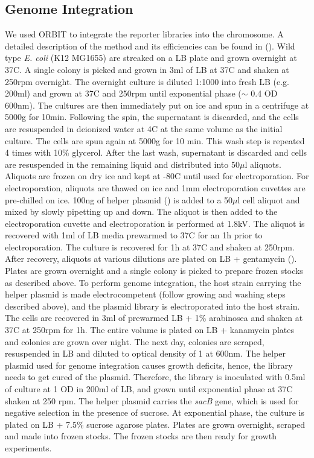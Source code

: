 \subsection{Genome Integration}
We used ORBIT to integrate the reporter libraries into the chromosome. A detailed description of the method and its efficiencies can be found in (). Wild type \textit{E. coli} (K12 MG1655) are streaked on a LB plate and grown overnight at 37C. A single colony is picked and grown in 3ml of LB at 37C and shaken at 250rpm overnight. The overnight culture is diluted 1:1000 into fresh LB (e.g. 200ml) and grown at 37C and 250rpm until exponential phase ($\sim$ 0.4 OD 600nm). The cultures are then immediately put on ice and spun in a centrifuge at 5000g for 10min. Following the spin, the supernatant is discarded, and the cells are resuspended in deionized water at 4C at the same volume as the initial culture. The cells are spun again at 5000g for 10 min. This wash step is repeated 4 times with 10\% glycerol. After the last wash, supernatant is discarded and cells are resuspended in the remaining liquid and distributed into 50$\mu$l aliquots. Aliquots are frozen on dry ice and kept at -80C until used for electroporation. For electroporation, aliquots are thawed on ice and 1mm electroporation cuvettes are pre-chilled on ice. 100ng of helper plasmid () is added to a 50$\mu$l cell aliquot and mixed by slowly pipetting up and down. The aliquot is then added to the electroporation cuvette and electroporation is performed at 1.8kV. The aliquot is recovered with 1ml of LB media prewarmed to 37C for an 1h prior to electroporation. The culture is recovered for 1h at 37C and shaken at 250rpm. After recovery, aliquots at various dilutions are plated on LB + gentamycin (). Plates are grown overnight and a single colony is picked to prepare frozen stocks as described above. To perform genome integration, the host strain carrying the helper plasmid is made electrocompetent (follow growing and washing steps described above), and the plasmid library is electroporated into the host strain. The cells are recovered in 3ml of prewarmed LB + 1\% arabinosea and shaken at 37C at 250rpm for 1h. The entire volume is plated on LB + kanamycin plates  and colonies are grown over night. The next day, colonies are scraped, resuspended in LB and diluted to optical density of 1 at 600nm. The helper plasmid used for genome integration causes growth deficits, hence, the library needs to get cured of the plasmid. Therefore, the library is inoculated with 0.5ml of culture at 1 OD in 200ml of LB, and grown until exponential phase at 37C shaken at 250 rpm. The helper plasmid carries the \textit{sacB} gene, which is used for negative selection in the presence of sucrose. At exponential phase, the culture is plated on LB + 7.5\% sucrose agarose plates. Plates are grown overnight, scraped and made into frozen stocks. The frozen stocks are then ready for growth experiments.


